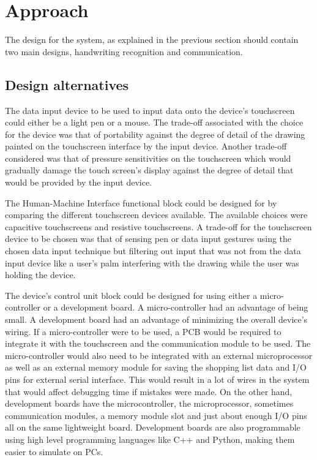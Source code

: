 


\section{Approach}

The design for the system, as explained in the previous section should contain two main designs, handwriting recognition and communication.

\subsection{Design alternatives}

The data input device to be used to input data onto the device’s touchscreen could either be a light pen or a mouse. The trade-off associated with the choice for the device was that of portability against the degree of detail of the drawing painted on the touchscreen interface by the input device. Another trade-off considered was that of pressure sensitivities on the touchscreen which would gradually damage the touch screen’s display against the degree of detail that would be provided by the input device. 

The Human-Machine Interface functional block could be designed for by comparing the different touchscreen devices available. The available choices were capacitive touchscreens and resistive touchscreens. A trade-off for the touchscreen device to be chosen was that of sensing pen or data input gestures using the chosen data input technique but filtering out input that was not from the data input device like a user’s palm interfering with the drawing while the user was holding the device. 

The device’s control unit block could be designed for using either a micro-controller or a development board. A micro-controller had an advantage of being small. A development board had an advantage of minimizing the overall device’s wiring. If a micro-controller were to be used, a PCB would be required to integrate it with the touchscreen and the communication module to be used. The micro-controller would also need to be integrated with an external microprocessor as well as an external memory module for saving the shopping list data and I/O pins for external serial interface. This would result in a lot of wires in the system that would affect debugging time if mistakes were made. On the other hand, development boards have the microcontroller, the microprocessor, sometimes communication modules, a memory module slot and just about enough I/O pins all on the same lightweight board. Development boards are also programmable using high level programming languages like C++ and Python, making them easier to simulate on PCs.

